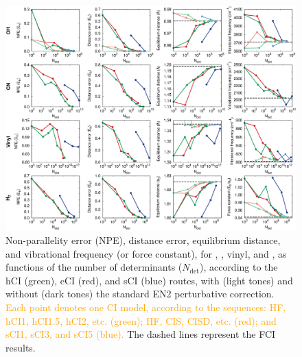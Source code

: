 \documentclass[aip,jcp,reprint,noshowkeys,superscriptaddress]{revtex4-1}
\newcommand{\fk}[1]{\textcolor{orange}{#1}}
\newcommand{\Ndet}{N_\text{det}}
\begin{document}
\begin{figure}%
\includegraphics[width=1.0\linewidth]{plot_all}
\caption{
Non-parallelity error (NPE), distance error, equilibrium distance, and vibrational frequency (or force constant), for , , vinyl, and ,
as functions of the number of determinants ($\Ndet$), according to the hCI (green), eCI (red), and sCI (blue) routes,
with (light tones) and without (dark tones) the standard EN2 perturbative correction.
\fk{Each point denotes one CI model, according to the sequences: HF, hCI1, hCI1.5, hCI2, etc. (green); HF, CIS, CISD, etc. (red); and sCI1, sCI3, and sCI5 (blue).}
The dashed lines represent the FCI results.}
\label{fig:plot_all}
\end{figure}
\end{document}
